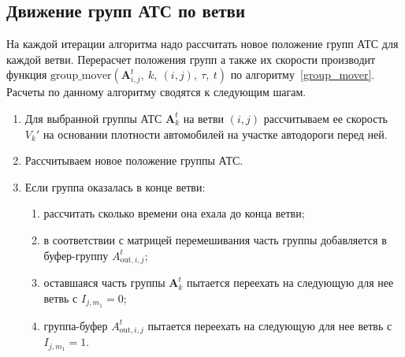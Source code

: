 \subsection{Движение групп АТС по ветви}
На каждой итерации алгоритма надо рассчитать новое положение групп АТС для каждой ветви.
Перерасчет положения групп а также их скорости производит функция $\text{group\_mover}(\mathbf{A}^t_{i,j},\ k,\ (i,j),\ \tau,\ t)$ по алгоритму~\ref{group_mover}.
Расчеты по данному алгоритму сводятся к следующим шагам.
\begin{enumerate}[leftmargin=2.05cm,label=Шаг \arabic*.,ref=\arabic*]
  \item Для выбранной группы АТС $\mathbf{A}^t_k$ на ветви $(i,j)$ рассчитываем ее скорость $V_k'$ на основании плотности автомобилей на участке автодороги перед ней.
  \item Рассчитываем новое положение группы АТС.
  \item Если группа оказалась в конце ветви:
  \begin{enumerate}
    \item рассчитать сколько времени она ехала до конца ветви;
    \item в соответствии с матрицей перемешивания часть группы добавляется в буфер-группу $A^t_{\text{out}, i, j}$;
    \item оставшаяся часть группы $\mathbf{A}^t_k$ пытается переехать на следующую для нее ветвь с $I_{j, m_1} = 0$;
    \item группа-буфер $A^t_{\text{out}, i, j}$ пытается переехать на следующую для нее ветвь с $I_{j, m_1} = 1$.
  \end{enumerate}
\end{enumerate}

